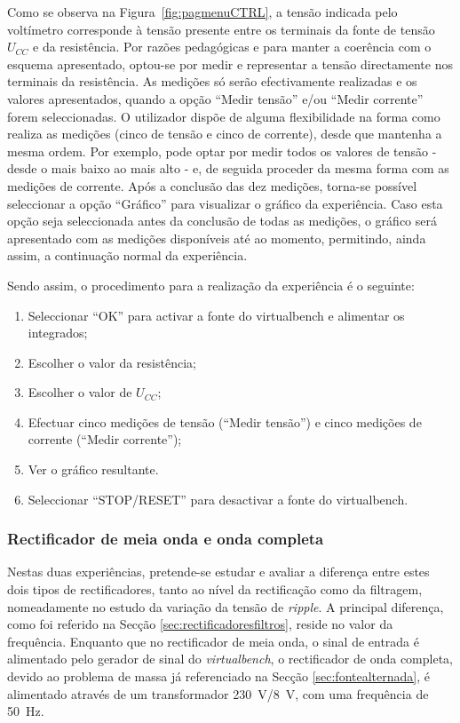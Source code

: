 Como se observa na Figura~\ref{fig:pagmenuCTRL}, a tensão indicada pelo voltímetro corresponde à tensão presente entre os terminais da fonte de tensão $U_{CC}$ e da resistência. Por razões pedagógicas e para manter a coerência com o esquema apresentado, optou-se por medir e representar a tensão directamente nos terminais da resistência. As medições só serão efectivamente realizadas e os valores apresentados, quando a opção ``Medir tensão'' e/ou ``Medir corrente'' forem seleccionadas. O utilizador dispõe de alguma flexibilidade na forma como realiza as medições (cinco de tensão e cinco de corrente), desde que mantenha a mesma ordem. Por exemplo, pode optar por medir todos os valores de tensão - desde o mais baixo ao mais alto - e, de seguida proceder da mesma forma com as medições de corrente. Após a conclusão das dez medições, torna-se possível seleccionar a opção ``Gráfico'' para visualizar o gráfico da experiência. Caso esta opção seja seleccionada antes da conclusão de todas as medições, o gráfico será apresentado com as medições disponíveis até ao momento, permitindo, ainda assim, a continuação normal da experiência.

Sendo assim, o procedimento para a realização da experiência é o seguinte:
\begin{enumerate}
	\item Seleccionar ``OK'' para activar a fonte do \acrshort{virtualbench} e alimentar os integrados;
	\item Escolher o valor da resistência;
	\item Escolher o valor de $U_{CC}$;
	\item Efectuar cinco medições de tensão (``Medir tensão'') e cinco medições de corrente (``Medir corrente'');
	\item Ver o gráfico resultante.
	\item Seleccionar ``STOP/RESET'' para desactivar a fonte do \acrshort{virtualbench}.
\end{enumerate}

\subsubsection{Rectificador de meia onda e onda completa}
\label{sec:rectificadores}
Nestas duas experiências, pretende-se estudar e avaliar a diferença entre estes dois tipos de rectificadores, tanto ao nível da rectificação como da filtragem, nomeadamente no estudo da variação da tensão de \textit{ripple}. A principal diferença, como foi referido na Secção \ref{sec:rectificadoresfiltros}, reside no valor da frequência. Enquanto que no rectificador de meia onda, o sinal de entrada é alimentado pelo gerador de sinal do \textit{virtualbench}, o rectificador de onda completa, devido ao problema de massa já referenciado na Secção \ref{sec:fontealternada}, é alimentado através de um transformador \SI{230}{\volt}/\SI{8}{\volt}, com uma frequência de \SI{50}{\hertz}.

